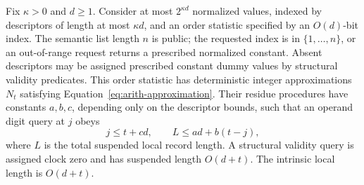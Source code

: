 \begin{lemma}
\label{lem:arith-rank}
Fix $\kappa>0$ and $d\geq1$.  Consider at most $2^{\kappa d}$
normalized values, indexed by descriptors of length at most
$\kappa d$, and an order statistic specified by an $O(d)$-bit
index.  The semantic list length $n$ is public; the requested index
is in $\{1,\ldots,n\}$, or an out-of-range request returns a
prescribed normalized constant.  Absent descriptors may be assigned
prescribed constant dummy values by structural validity predicates.
This order statistic has deterministic integer approximations $N_t$
satisfying Equation~\eqref{eq:arith-approximation}.  Their residue
procedures have constants $a,b,c$, depending only on the descriptor
bounds, such that an operand digit query at $j$ obeys
\begin{equation}
 j\leq t+cd,\qquad
 L\leq ad+b(t-j),
 \label{eq:arith-local-bound}
\end{equation}
where $L$ is the total suspended local record length.  A structural
validity query is assigned clock zero and has suspended length
$O(d+t)$.  The intrinsic local length is $O(d+t)$.
\end{lemma}

